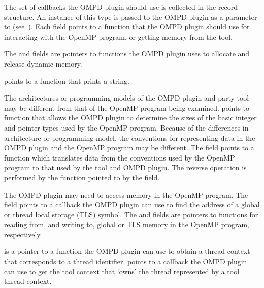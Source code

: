 \descr
The set of callbacks the OMPD plugin should use is collected
in the  record structure.
An instance of this type is passed to the OMPD plugin
as a parameter to  (see~).
Each field points to a function that the OMPD plugin should use
for interacting with the OpenMP program, or getting memory from
the tool.

The  and  fields are
pointers to functions the OMPD plugin uses to allocate and release
dynamic memory.

 points to a function that prints a string.

The architectures or programming models of the OMPD plugin and
party tool may be different from that of the OpenMP
program being examined.
 points to function that allows
the OMPD plugin to determine the sizes of the basic integer
and pointer types used by the OpenMP program.
Because of the differences in architecture or programming model,
the conventions for representing data in the OMPD plugin and
the OpenMP program may be different.
The  field points to a function which translates
data from the conventions used by the OpenMP program to that used
by the tool and OMPD plugin.
The reverse operation is performed by the function pointed
to by the  field.

The OMPD plugin may need to access memory in the OpenMP program.
The  field points to a callback the
OMPD plugin can use to find the address of a global or thread
local storage (TLS) symbol.
The  and  fields are
pointers to functions for reading from, and writing to, global or TLS
memory in the OpenMP program, respectively.

 is a pointer to a function
the OMPD plugin can use to obtain a thread context that corresponds to
a thread identifier.
 points to a callback
the OMPD plugin can use to get the tool context that `owns' the
thread represented by a tool thread context.


